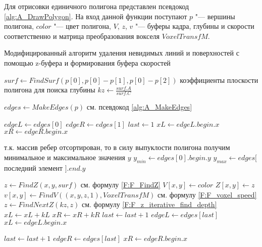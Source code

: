 Для отрисовки единичного полигона представлен псевдокод \ref{alg:A_DrawPolygon}.  На вход данной функции поступают $p$ "--- вершины полигона, $color$ "--- цвет полигона, $V$, $z$, $v$ "--- буферы кадра, глубины и скорости соответственно и матрица преобразования вокселя $VoxelTransfM$.


\begin{breakablealgorithm}
\caption{Модифицированный алгоритм удаления невидимых линий и поверхностей с помощью z-буфера и формирования буфера скоростей} \label{alg:A_DrawPolygon}

\begin{algorithmic}[1]
    \State 
        $surf \leftarrow FindSurf(
            p[0],
            p[0] - p[1],
            p[0] - p[2]
        )$
        \Comment коэффициенты плоскости полигона для поиска глубины
    \State $kz \leftarrow \frac{surf.A}{surf.C}$    
    \Statex

    \State $edges \leftarrow MakeEdges(p)$ \Comment см. псевдокод \ref{alg:A_MakeEdges} 
    
    \State $edgeL \leftarrow edges[0]$ 
    \State $edgeR \leftarrow edges[1]$
    \State $last \leftarrow 1$ 
    \Statex
    \State $xL \leftarrow edgeL.begin.x$ 
    \State $xR \leftarrow edgeR.begin.x$

    \Statex \Comment т.к. массив ребер отсортирован, то в силу выпуклости полигона получим минимальное и максимальное значения $y$
    \State $y_{min} \leftarrow edges[0].begin.y$
    \State $y_{max} \leftarrow edges[$ последний элемент $].end.y$ 

        
        \State $z \leftarrow FindZ(x,y, surf)$ \Comment см. формулу \eqref{F:F_FindZ} 
                \State $V[x,y] \leftarrow color$
                \State $Z[x,y] \leftarrow z$
                \State $v[x,y] \leftarrow FindV((x,y,z,1), VoxelTransfM)$ 
                \Statex \Comment см. формулу \eqref{F:F_voxel_speed} 
            \EndIf
            \State $z \leftarrow FindNextZ(kz, z)$ \Comment см. формулу \eqref{F:F_z_iterative_find_depth} 
        \EndFor
        \State $xL \leftarrow xL + kL$
        \State $xR \leftarrow xR + kR$
            \State $last \leftarrow last + 1$
            \State $edgeL \leftarrow edges[last]$
            \State $xL \leftarrow edgeL.begin.x$ 
        \EndIf
        
            \State $last \leftarrow last + 1$
            \State $edgeR \leftarrow edges[last]$
            \State $xR \leftarrow edgeR.begin.x$ 
        \EndIf

    \EndFor
    
\EndFunction
\Statex 

\end{algorithmic}
\end{breakablealgorithm}

